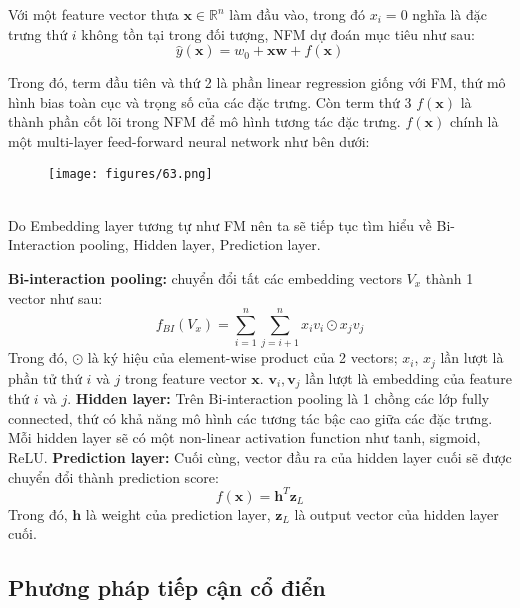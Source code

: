 \indent Với một feature vector thưa $\mathbf{x} \in \mathbb{R}^{n}$ làm đầu vào, trong đó $x_i = 0$ nghĩa là đặc trưng thứ $i$ không tồn tại trong đối tượng, 
NFM dự đoán mục tiêu như sau:
$$ \hat{y}(\mathbf{x}) = w_0 + \mathbf{xw} + f(\mathbf{x})$$

Trong đó, term đầu tiên và thứ 2 là phần linear regression giống với FM, 
thứ mô hình bias toàn cục và trọng số của các đặc trưng. Còn term thứ 3 $f(\mathbf{x})$ là thành phần cốt lõi trong NFM 
để mô hình tương tác đặc trưng. $f(\mathbf{x})$ chính là một multi-layer feed-forward neural network như bên dưới:
\begin{figure}[h]
    \centering
    \texttt{[image: figures/63.png]}
\end{figure}\\
Do Embedding layer tương tự như FM nên ta sẽ tiếp tục tìm hiểu về Bi-Interaction pooling, Hidden layer, Prediction layer.

\textbf{Bi-interaction pooling:} chuyển đổi tất các embedding vectors $V_x$ thành 1 vector như sau:
$$ f_{BI}(V_x) = \sum_{i=1}^{n} \sum_{j=i+1}^{n} x_i v_i \odot x_j v_j $$
Trong đó, $\odot$ là ký hiệu của element-wise product của 2 vectors; $x_i$, $x_j$ lần lượt 
là phần tử thứ $i$ và $j$ trong feature vector $\mathbf{x}$. $\mathbf{v}_i, \mathbf{v}_j$ lần lượt là embedding của feature thứ $i$ và $j$.
\textbf{Hidden layer:} Trên Bi-interaction pooling là 1 chồng các lớp fully connected, thứ có khả năng mô hình các tương tác bậc cao giữa các đặc trưng. 
Mỗi hidden layer sẽ có một non-linear activation function như tanh, sigmoid, ReLU.
\textbf{Prediction layer:} Cuối cùng, vector đầu ra của hidden layer cuối sẽ được chuyển đổi thành prediction score:
$$f(\mathbf{x}) = \mathbf{h}^T \mathbf{z}_L$$
Trong đó, $\mathbf{h}$ là weight của prediction layer, $\mathbf{z}_L$ là output vector của hidden layer cuối.

\subsection{Phương pháp tiếp cận cổ điển}
